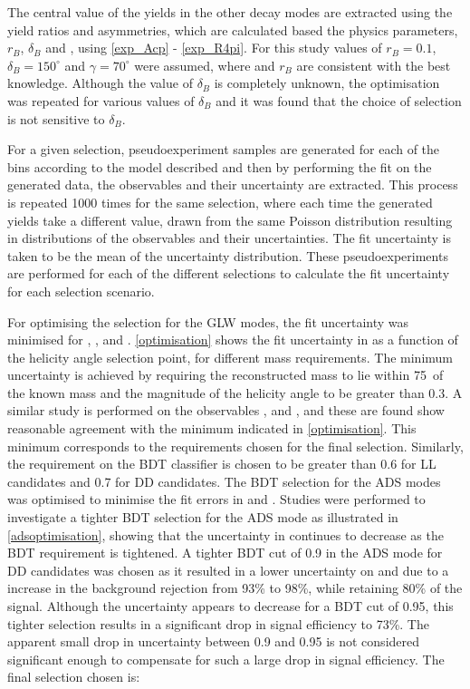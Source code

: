 The central value of the yields in the other \Dz decay modes are extracted using the yield ratios and asymmetries, which are calculated based the physics parameters, $r_B$, $\delta_B$ and \Pgamma, using \eqns\ref{exp_Acp} - \ref{exp_R4pi}. For this study values of $r_B = 0.1$, $\delta_B = 150^{\circ}$ and $\gamma = 70^{\circ}$ were assumed, where \Pgamma and $r_B$ are consistent with the best knowledge. Although the value of $\delta_B$ is completely unknown, the optimisation was repeated for various values of $\delta_B$ and it was found that the choice of selection is not sensitive to $\delta_B$. 

For a given selection, pseudoexperiment samples are generated for each of the bins according to the model described and then by performing the \CP fit on the generated data, the \CP observables and their uncertainty are extracted. This process is repeated 1000 times for the same selection, where each time the generated yields take a different value, drawn from the same Poisson distribution resulting in distributions of the \CP observables and their uncertainties. The fit uncertainty is taken to be the mean of the uncertainty distribution. These pseudoexperiments are performed for each of the different selections to calculate the fit uncertainty for each selection scenario.  

For optimising the selection for the GLW modes, the fit uncertainty was minimised for \Akk, \Rkk, \Apipi and \Rpipi. \Fig\ref{optimisation} shows the fit uncertainty in \Rkk as a function of the \KS helicity angle selection point, for different \Kstarm mass requirements. The minimum uncertainty is achieved by requiring the reconstructed \Kstarm mass to lie within 75~\mevcc of the known \Kstarm mass and the magnitude of the \KS helicity angle to be greater than 0.3. A similar study is performed on the \CP observables \Akk, \Apipi and \Rpipi, and these are found show reasonable agreement with the minimum indicated in \fig\ref{optimisation}. This minimum corresponds to the \Kstarm requirements chosen for the final selection. Similarly, the requirement on the BDT classifier is chosen to be greater than 0.6 for LL candidates and 0.7 for DD candidates. The BDT selection for the ADS modes was optimised to minimise the fit errors in \Rptwo and \Rmtwo. Studies were performed to investigate a tighter BDT selection for the ADS mode as illustrated in \fig\ref{adsoptimisation}, showing that the uncertainty in \Rptwo continues to decrease as the BDT requirement is tightened. A tighter BDT cut of 0.9 in the ADS mode for DD candidates was chosen as it resulted in a lower uncertainty on \Rptwo and \Rmtwo due to a increase in the background rejection from 93\% to 98\%, while retaining 80\% of the signal. Although the uncertainty appears to decrease for a BDT cut of 0.95, this tighter selection results in a significant drop in signal efficiency to 73\%. The apparent small drop in uncertainty between 0.9 and 0.95 is not considered significant enough to compensate for such a large drop in signal efficiency. The final selection chosen is:

